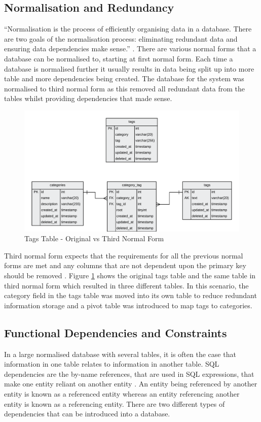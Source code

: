 \subsection{Normalisation and Redundancy}
\label{SubSection:Database_Normalisation}
``Normalisation is the process of efficiently organising data in a database. There are two goals of the normalisation process: eliminating redundant data and ensuring data dependencies make sense.'' \cite{Databases:NormalisationBasics}. There are various normal forms that a database can be normalised to, starting at first normal form. Each time a database is normalised further it usually results in data being split up into more table and more dependencies being created. The database for the system was normalised to third normal form as this removed all redundant data from the tables whilst providing dependencies that made sense.

\begin{figure}[H]
	\centering
	\includegraphics[width=1.0\textwidth]{Images/Design/Database/3NF_Tags}
	\caption{Tags Table - Original vs Third Normal Form} \label{fig:3NF_Tags}
\end{figure}

Third normal form expects that the requirements for all the previous normal forms are met and any columns that are not dependent upon the primary key should be removed \cite{Databases:NormalisationBasics}. Figure \ref{fig:3NF_Tags} shows the original tags table and the same table in third normal form which resulted in three different tables. In this scenario, the category field in the tags table was moved into its own table to reduce redundant information storage and a pivot table was introduced to map tags to categories.

\subsection{Functional Dependencies and Constraints}
\label{SubSection:Database_Constraints}
In a large normalised database with several tables, it is often the case that information in one table relates to information in another table. SQL dependencies are the by-name references, that are used in SQL expressions, that make one entity reliant on another entity \cite{Microsoft:Dependencies}. An entity being referenced by another entity is known as a referenced entity whereas an entity referencing another entity is known as a referencing entity. There are two different types of dependencies that can be introduced into a database.

